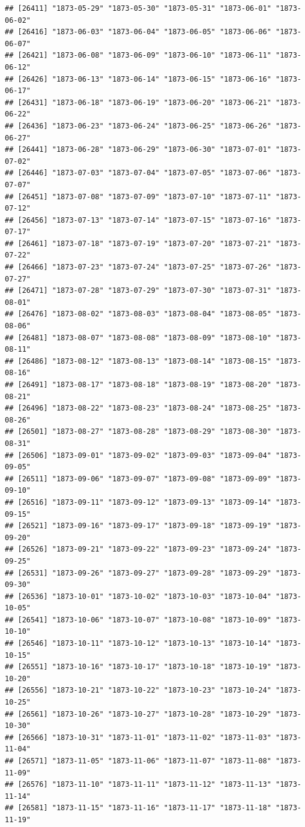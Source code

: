 \documentclass{article}\usepackage[]{graphicx}\usepackage[]{color}
\makeatletter
\newenvironment{kframe}{%
 \def\at@end@of@kframe{}%
 \ifinner\ifhmode%
  \def\at@end@of@kframe{\end{minipage}}%
  \begin{minipage}{\columnwidth}%
 \fi\fi%
 \def\FrameCommand##1{\hskip\@totalleftmargin \hskip-\fboxsep
 \colorbox{shadecolor}{##1}\hskip-\fboxsep
     \hskip-\linewidth \hskip-\@totalleftmargin \hskip\columnwidth}%
 \MakeFramed {\advance\hsize-\width
   \@totalleftmargin\z@ \linewidth\hsize
   \@setminipage}}%
 {\par\unskip\endMakeFramed%
 \at@end@of@kframe}
\newenvironment{knitrout}{}{} %
\makeatother
\begin{document}
\begin{description}
\begin{knitrout}
\begin{kframe}
\begin{verbatim}
## [26411] "1873-05-29" "1873-05-30" "1873-05-31" "1873-06-01" "1873-06-02"
## [26416] "1873-06-03" "1873-06-04" "1873-06-05" "1873-06-06" "1873-06-07"
## [26421] "1873-06-08" "1873-06-09" "1873-06-10" "1873-06-11" "1873-06-12"
## [26426] "1873-06-13" "1873-06-14" "1873-06-15" "1873-06-16" "1873-06-17"
## [26431] "1873-06-18" "1873-06-19" "1873-06-20" "1873-06-21" "1873-06-22"
## [26436] "1873-06-23" "1873-06-24" "1873-06-25" "1873-06-26" "1873-06-27"
## [26441] "1873-06-28" "1873-06-29" "1873-06-30" "1873-07-01" "1873-07-02"
## [26446] "1873-07-03" "1873-07-04" "1873-07-05" "1873-07-06" "1873-07-07"
## [26451] "1873-07-08" "1873-07-09" "1873-07-10" "1873-07-11" "1873-07-12"
## [26456] "1873-07-13" "1873-07-14" "1873-07-15" "1873-07-16" "1873-07-17"
## [26461] "1873-07-18" "1873-07-19" "1873-07-20" "1873-07-21" "1873-07-22"
## [26466] "1873-07-23" "1873-07-24" "1873-07-25" "1873-07-26" "1873-07-27"
## [26471] "1873-07-28" "1873-07-29" "1873-07-30" "1873-07-31" "1873-08-01"
## [26476] "1873-08-02" "1873-08-03" "1873-08-04" "1873-08-05" "1873-08-06"
## [26481] "1873-08-07" "1873-08-08" "1873-08-09" "1873-08-10" "1873-08-11"
## [26486] "1873-08-12" "1873-08-13" "1873-08-14" "1873-08-15" "1873-08-16"
## [26491] "1873-08-17" "1873-08-18" "1873-08-19" "1873-08-20" "1873-08-21"
## [26496] "1873-08-22" "1873-08-23" "1873-08-24" "1873-08-25" "1873-08-26"
## [26501] "1873-08-27" "1873-08-28" "1873-08-29" "1873-08-30" "1873-08-31"
## [26506] "1873-09-01" "1873-09-02" "1873-09-03" "1873-09-04" "1873-09-05"
## [26511] "1873-09-06" "1873-09-07" "1873-09-08" "1873-09-09" "1873-09-10"
## [26516] "1873-09-11" "1873-09-12" "1873-09-13" "1873-09-14" "1873-09-15"
## [26521] "1873-09-16" "1873-09-17" "1873-09-18" "1873-09-19" "1873-09-20"
## [26526] "1873-09-21" "1873-09-22" "1873-09-23" "1873-09-24" "1873-09-25"
## [26531] "1873-09-26" "1873-09-27" "1873-09-28" "1873-09-29" "1873-09-30"
## [26536] "1873-10-01" "1873-10-02" "1873-10-03" "1873-10-04" "1873-10-05"
## [26541] "1873-10-06" "1873-10-07" "1873-10-08" "1873-10-09" "1873-10-10"
## [26546] "1873-10-11" "1873-10-12" "1873-10-13" "1873-10-14" "1873-10-15"
## [26551] "1873-10-16" "1873-10-17" "1873-10-18" "1873-10-19" "1873-10-20"
## [26556] "1873-10-21" "1873-10-22" "1873-10-23" "1873-10-24" "1873-10-25"
## [26561] "1873-10-26" "1873-10-27" "1873-10-28" "1873-10-29" "1873-10-30"
## [26566] "1873-10-31" "1873-11-01" "1873-11-02" "1873-11-03" "1873-11-04"
## [26571] "1873-11-05" "1873-11-06" "1873-11-07" "1873-11-08" "1873-11-09"
## [26576] "1873-11-10" "1873-11-11" "1873-11-12" "1873-11-13" "1873-11-14"
## [26581] "1873-11-15" "1873-11-16" "1873-11-17" "1873-11-18" "1873-11-19"

\end{verbatim}
\end{kframe}
\end{knitrout}
\end{description}
\end{document}
